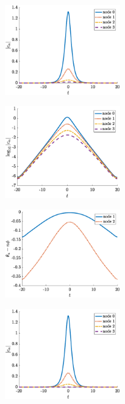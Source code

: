\documentclass[11pt,reqno]{amsart}
\begin{document}
\begin{figure}
    \centering
    \begin{subfigure}{0.3\linewidth}
        \caption{}
        \label{fig:m6025amp}
        \includegraphics[width=5cm]{m6phi025amp.eps}
    \end{subfigure}
    \begin{subfigure}{0.3\linewidth}
        \caption{}
        \label{fig:m6025amp}
        \includegraphics[width=5cm]{m6phi025logamp.eps}
    \end{subfigure}
    \begin{subfigure}{0.3\linewidth}
        \caption{}
        \label{fig:m6025phase}
        \includegraphics[width=5cm]{m6phi025phase.eps}
    \end{subfigure}
    \begin{subfigure}{0.3\linewidth}
        \caption{}
        \label{fig:m6pi6amp}
        \includegraphics[width=5cm]{m6phipi6amp.eps}

\end{subfigure}
\end{figure}
\end{document}
